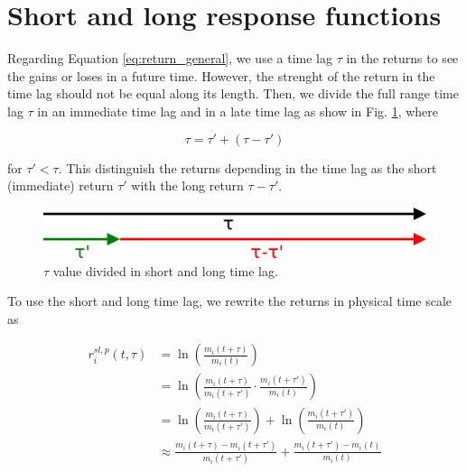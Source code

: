 \section{Short and long response functions}\label{sec:short_long}

Regarding Equation \ref{eq:return_general}, we use a time lag $\tau$ in the
returns to see the gains or loses in a future time. However, the strenght of the return in the time lag
should not be equal along its length. Then, we divide the full range time lag $\tau$ in an
immediate time lag and in a late time lag as show in Fig. \ref{fig:tau_short_long}, where

\begin{equation}\label{eq:tau_short_long}
    \tau = \tau' + \left( \tau - \tau' \right)
\end{equation}

for $\tau' < \tau$. This distinguish the returns depending in the time lag as
the short (immediate) return $\tau'$ with the long return $\tau - \tau'$.

\begin{figure}[htbp]
    \centering
    \includegraphics[width=\columnwidth]{figures/05_tau_short_long.png}
    \caption{$\tau$ value divided in short and long time lag.}
    \label{fig:tau_short_long}
\end{figure}

To use the short and long time lag, we rewrite the returns in physical
time scale as

\begin{align}\label{eq:short_long_return}
    r^{sl,p}_{i}\left(t,\tau\right)&=\ln\left(\frac{m_{i}\left(t+\tau\right)}
    {m_{i} \left(t\right)}\right) \nonumber \\
    &=\ln\left(\frac{m_{i}\left(t+\tau\right)}{m_{i}\left(t+\tau'\right)}
    \cdot\frac{m_{i} \left(t+\tau'\right)}{m_{i}\left(t\right)}\right)
    \nonumber \\
    &=\ln\left(\frac{m_{i}\left(t+\tau\right)}{m_{i}\left(t+\tau'\right)}
    \right)+ \ln\left(\frac{m_{i}\left(t+\tau'\right)}{m_{i}\left(t\right)}
    \right)\nonumber \\
    &\approx\frac{m_{i}\left(t+\tau\right)-m_{i}\left(t+\tau'\right)}
    {m_{i}\left(t+\tau'\right)} +\frac{m_{i}\left(t+\tau'\right)-m_{i}
    \left(t\right)}{m_{i}\left(t\right)}
\end{align}

